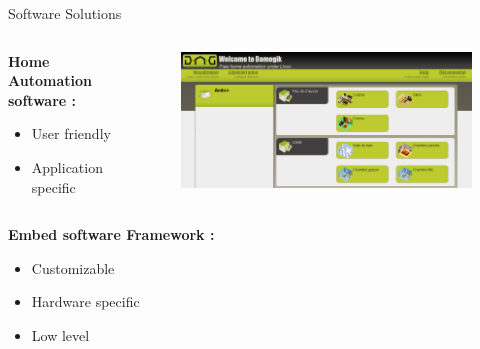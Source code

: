 \documentclass{beamer}
\begin{document}
\begin{frame}{Software Solutions}
\begin{columns}
\begin{column}[l]{0.5\textwidth}
\textbf{Home Automation software :}
\begin{itemize}
\item[\Large\smiley] User friendly
\item[\Large\frownie] Application specific

\end{itemize}
\end{column}
\begin{column}[r]{0.5\textwidth}
\begin{figure}
\includegraphics[width=\columnwidth]{figures/screen_domogik.png}
\end{figure}
\end{column}
\end{columns}

\begin{columns}
\begin{column}[l]{0.5\textwidth}
\textbf{Embed software Framework  :}
\begin{itemize}
\item[\Large\smiley] Customizable

\item[\Large\frownie] Hardware specific
\item[\Large\frownie] Low level


\end{itemize}
\end{column}
\end{columns}
\end{frame}
\end{document}
